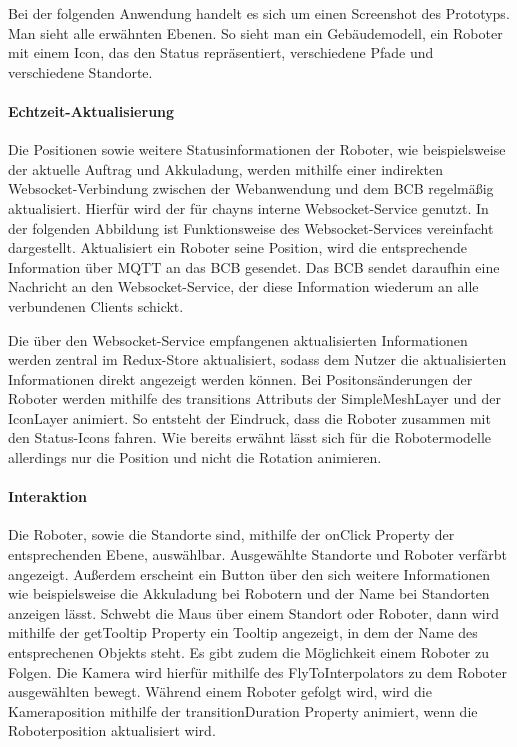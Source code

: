 Bei der folgenden Anwendung handelt es sich um einen Screenshot des Prototyps. Man sieht alle erwähnten Ebenen. So sieht man ein Gebäudemodell, ein Roboter mit einem Icon, das den Status repräsentiert, verschiedene Pfade und verschiedene Standorte.

\paragraph{Echtzeit-Aktualisierung}
Die Positionen sowie weitere Statusinformationen der Roboter, wie beispielsweise der aktuelle Auftrag und Akkuladung, werden mithilfe einer indirekten \gls{Websocket}-Verbindung zwischen der Webanwendung und dem \ac{BCB} regelmäßig aktualisiert. Hierfür wird der für chayns interne Websocket-Service genutzt. In der folgenden Abbildung ist Funktionsweise des Websocket-Services vereinfacht dargestellt. Aktualisiert ein Roboter seine Position, wird die entsprechende Information über \gls{MQTT} an das \ac{BCB} gesendet.
Das \ac{BCB} sendet daraufhin eine Nachricht an den Websocket-Service, der diese Information wiederum an alle verbundenen Clients schickt.

Die über den Websocket-Service empfangenen aktualisierten Informationen werden zentral im Redux-Store aktualisiert, sodass dem Nutzer die aktualisierten Informationen direkt angezeigt werden können. Bei Positonsänderungen der Roboter werden mithilfe des transitions Attributs der SimpleMeshLayer und der IconLayer animiert. So entsteht der Eindruck, dass die Roboter zusammen mit den Status-Icons fahren. Wie bereits erwähnt lässt sich für die Robotermodelle allerdings nur die Position und nicht die Rotation animieren.

\paragraph{Interaktion}
Die Roboter, sowie die Standorte sind, mithilfe der onClick Property der entsprechenden Ebene, auswählbar.
Ausgewählte Standorte und Roboter verfärbt angezeigt. Außerdem erscheint ein Button über den sich weitere Informationen wie beispielsweise die Akkuladung bei Robotern und der Name bei Standorten anzeigen lässt. Schwebt die Maus über einem Standort oder Roboter, dann wird mithilfe der getTooltip Property ein Tooltip angezeigt, in dem der Name des entsprechenen Objekts steht.
Es gibt zudem die Möglichkeit einem Roboter zu Folgen. Die Kamera wird hierfür mithilfe des FlyToInterpolators zu dem Roboter ausgewählten bewegt. 
Während einem Roboter gefolgt wird, wird die Kameraposition mithilfe der transitionDuration Property animiert, wenn die Roboterposition aktualisiert wird.


